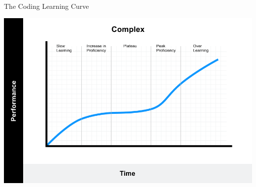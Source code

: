 \documentclass[aspectratio=169]{beamer}
\begin{document}
\begin{frame}{The Coding Learning Curve}


\centering
\includegraphics[width=0.7\linewidth]{graphics/complex-lc.png}
	
\end{frame}
\end{document}
